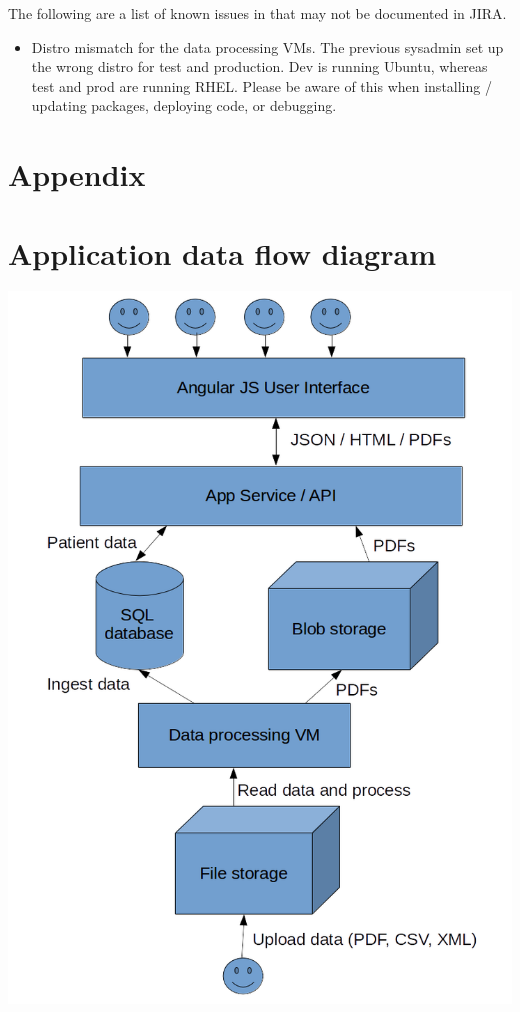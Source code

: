 \documentclass[10pt,a4paper,oneside]{article}
\begin{document}
	The following are a list of known issues in that may not be documented in JIRA. 
	
	\begin{itemize}
		\item Distro mismatch for the data processing VMs. The previous sysadmin set up the wrong distro for test and production. Dev is running Ubuntu, whereas test and prod are running RHEL. Please be aware of this when installing / updating packages, deploying code, or debugging.
	\end{itemize}

\section{Appendix}
\appendix
\section{Application data flow diagram}
\label{appendix:diagram}
\bigskip
\includegraphics[width=\textwidth, height=0.9\textheight, keepaspectratio]{FlowDiagram} 
\end{document}
